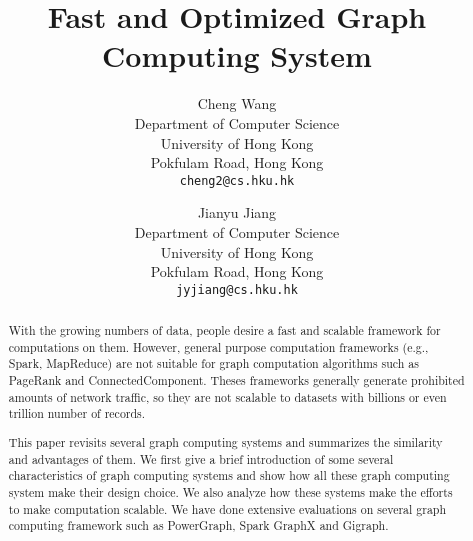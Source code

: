 \documentclass{acm_proc_article}
\newcommand{\eg}[0]{e.g.,}
\begin{document}
%

\title{Fast and Optimized Graph Computing System}
%

\author{
Cheng Wang\\
Department of Computer Science\\
University of Hong Kong\\
Pokfulam Road, Hong Kong\\
\texttt{cheng2@cs.hku.hk}
\and Jianyu Jiang\\
Department of Computer Science\\
University of Hong Kong \\
Pokfulam Road, Hong Kong \\
\texttt{jyjiang@cs.hku.hk}
}


%

\maketitle

\begin{abstract}
With the growing numbers of data, people desire a fast and scalable framework
for computations on them. However, general purpose computation
frameworks (\eg{} Spark, MapReduce)
are not suitable for graph computation algorithms such as PageRank and
ConnectedComponent. Theses frameworks generally generate prohibited amounts
of network traffic, so they are not scalable to datasets with billions or
even trillion number of records.

This paper revisits several graph computing systems and summarizes the similarity
and advantages of them. We first give a
brief introduction of some several characteristics of graph computing
systems and show how all these graph computing system make their design choice.
We also analyze how these systems make the efforts to
make computation scalable. We have done extensive evaluations on several graph
computing framework such as PowerGraph, Spark GraphX and Gigraph.
\end{abstract}
\end{document}
